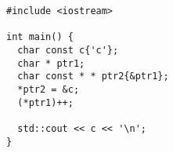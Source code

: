 \begin{frame}[fragile]
  \begin{lstlisting}[language={[11]C++}]
#include <iostream>

int main() {
  char const c{'c'};
  char * ptr1;
  char const * * ptr2{&ptr1};
  *ptr2 = &c;
  (*ptr1)++;

  std::cout << c << '\n';
}

  \end{lstlisting}
\end{frame}
